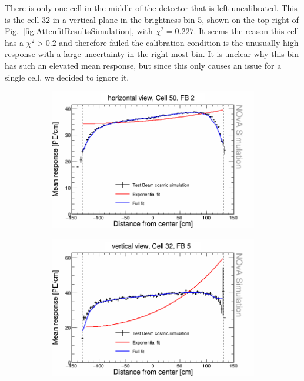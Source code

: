 There is only one cell in the middle of the detector that is left uncalibrated. This is the cell 32 in a vertical plane in the brightness bin 5, shown on the top right of Fig.~\ref{fig:AttenfitResultsSimulation}, with $\chi^2=0.227$. It seems the reason this cell has a $\chi^2>0.2$ and therefore failed the calibration condition is the unusually high response with a large uncertainty in the right-most bin. It is unclear why this bin has such an elevated mean response, but since this only causes an issue for a single cell, we decided to ignore it.

\begin{figure}[h]
  \begin{subfigure}{0.495\textwidth}
    \includegraphics[width=\linewidth]{Plots/RelativeCalibrationResults/sim_fb2_001_050.png}
  \end{subfigure}
  \begin{subfigure}{0.495\textwidth}
    \includegraphics[width=\linewidth]{Plots/RelativeCalibrationResults/sim_fb5_000_032.png}

\end{subfigure}
\end{figure}
